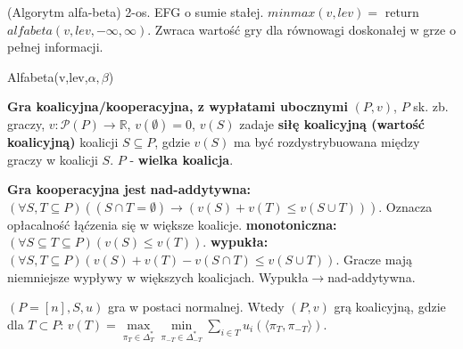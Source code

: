\begin{twierdzenie}{(Algorytm alfa-beta)}
    2-os. EFG o sumie stałej. $minmax(v,lev)=$ return $alfabeta(v,lev,-\infty,\infty)$. Zwraca wartość gry dla równowagi doskonałej w grze o pełnej informacji.
\end{twierdzenie}
\begin{algorithm}[H]
    \SetAlgoLined
    \LinesNumberedHidden
    
    \caption{Alfabeta(v,lev,$\alpha,\beta$)}
\end{algorithm}
\begin{definicja}{\textbf{Gra koalicyjna/kooperacyjna, z wypłatami ubocznymi}}
    $(P,v)$, $P$ sk. zb. graczy, $v:\mathcal{P}(P)\rightarrow\mathbb{R}$, $v(\emptyset)=0$, $v(S)$ zadaje 
    \textbf{siłę koalicyjną (wartość koalicyjną)} koalicji $S\subseteq P$, gdzie $v(S)$ ma być rozdystrybuowana między graczy w koalicji $S$.
    $P$ - \textbf{wielka koalicja}.
\end{definicja}
\begin{definicja}{\textbf{Gra kooperacyjna jest}}
    \textbf{nad-addytywna: } $(\forall S,T\subseteq P) ((S\cap T=\emptyset)\rightarrow(v(S)+v(T)\leq v(S\cup T)))$. Oznacza opłacalność łąćzenia się w większe koalicje.
    \textbf{monotoniczna: } $(\forall S\subseteq T\subseteq P) (v(S)\leq v(T))$.
    \textbf{wypukła: } $(\forall S,T\subseteq P) (v(S)+v(T)-v(S\cap T)\leq v(S\cup T))$. Gracze mają niemniejsze wypływy w większych koalicjach. Wypukła$\rightarrow$nad-addytywna.
\end{definicja}
\begin{fakt}\label{w10-f-normkoal}
    $(P=[n],S,u)$ gra w postaci normalnej. Wtedy $(P,v)$ grą koalicyjną, gdzie dla $T\subset P$: 
    $v(T)=\max\limits_{\pi_T\in\Delta_T^*}\min\limits_{\pi_{-T}\in\Delta_{-T}^*}\sum\limits_{i\in T}{u_i(\langle \pi_T,\pi_{-T} \rangle)}$.
\end{fakt}
